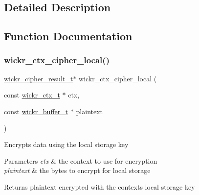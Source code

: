 \subsection{Detailed Description}


\subsection{Function Documentation}
\mbox{\label{group__wickr__ctx_gaeff6704dded2d44f689eca5ad25843f8}} 
\subsubsection{\texorpdfstring{wickr\+\_\+ctx\+\_\+cipher\+\_\+local()}{wickr\_ctx\_cipher\_local()}}
{\footnotesize\ttfamily \hyperlink{structwickr__cipher__result}{wickr\+\_\+cipher\+\_\+result\+\_\+t}$\ast$ wickr\+\_\+ctx\+\_\+cipher\+\_\+local (\begin{DoxyParamCaption}\item[{const \hyperlink{structwickr__ctx}{wickr\+\_\+ctx\+\_\+t} $\ast$}]{ctx,  }\item[{const \hyperlink{structwickr__buffer}{wickr\+\_\+buffer\+\_\+t} $\ast$}]{plaintext }\end{DoxyParamCaption})}

Encrypts data using the local storage key


\begin{DoxyParams}{Parameters}
{\em ctx} & the context to use for encryption \\
\hline
{\em plaintext} & the bytes to encrypt for local storage \\
\hline
\end{DoxyParams}
\begin{DoxyReturn}{Returns}
\textquotesingle{}plaintext\textquotesingle{} encrypted with the context\textquotesingle{}s local storage key 
\end{DoxyReturn}
\mbox{\label{group__wickr__ctx_ga0b985fb2cd05fb482b5ed175dfd650a0}} 
